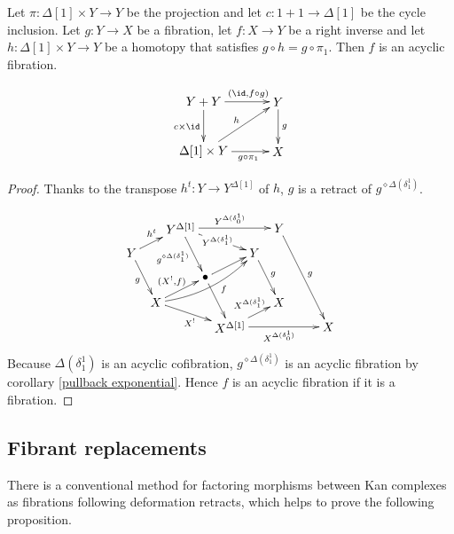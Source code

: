 \documentclass{tac}
\newcommand\hide[1]{}
\newcommand\bang{!}
\newcommand\of{:}
\newcommand\simplex\Delta
\newcommand\pe[1]{^{\diamond #1}}
\begin{document}
\begin{lemma} Let $\pi\of \simplex[1]\times Y\to Y$ be the projection and let $c\of 1+1\to\simplex[1]$ be the cycle inclusion. Let $g\of Y\to X$ be a fibration, let $f\of X\to Y$ be a right inverse and let $h\of \simplex[1]\times Y \to Y$ be a homotopy that satisfies $g\circ h = g\circ \pi_1$. Then $f$ is an acyclic fibration. \label{deformation is acyclic}
\hide{\[\xymatrix{
Y+Y\ar[rr]^{(\id,f\circ g)}\ar[d]_{c\times \id} && Y\ar[d]^g \\
\simplex[1]\times Y \ar[rr]_{g\circ\pi}\ar[urr]^h && X
}\]}
\[\xy
(0,14)*+{Y+Y}="up left",(21,14)*+{Y}="up right",
(0,0)*+{\simplex[1]\times Y}="down left",(21,0)*+{X}="down right"
\ar^(.6){(\id,f\circ g)} "up left";"up right" \ar_{c\times \id} "up left";"down left"
\ar^g "up right";"down right"
\ar_(.6){g\circ\pi_1} "down left";"down right" \ar^h "down left";"up right"
\endxy\]
\end{lemma}

\begin{proof}
Thanks to the transpose $h^t\of Y\to Y^{\simplex[1]}$ of $h$, $g$ is a retract of $g\pe{\simplex(\delta^1_1)}$.
\hide{\[\xymatrix{
Y\ar[d]_g \ar[r]^{h^t} & Y^{\simplex[1]} \ar[d]_{g\pe{\simplex(\delta^1_1)}} \ar[dr]^{Y^{\simplex(\delta^1_1)}} \ar[rr]^{Y^{\simplex(\delta^1_0)}}&& Y \ar[d]^g\\
X \ar[r]^{(X^\bang,f)} \ar[dr]_{X^\bang} \ar@/_3ex/[rr]_(.6)f & \bullet\ar[r]\ar[d] & Y \ar[d]_(.4)g & X \\
& X^{\simplex[1]} \ar[r]_{X^{\simplex(\delta_1^1)}} \ar@/_2ex/[urr]_(.7){X^{\simplex(\delta^1_0)}}& X
}\]}
\[\xy
(0,21)*+{Y}="Y0",(14,28)*+{Y^{\simplex[1]}}="Y1",(35,21)*+{Y}="Y2",(42,28)*+{Y}="Y3",
(21,14)*+{\bullet}="center",
(7,7)*+{X}="X0",(28,0)*+{X^{\simplex[1]}}="X1",(42,7)*+{X}="X2",(56,0)*+{X}="X3"
\ar_g "Y0";"X0" \ar^{h^t} "Y0";"Y1"
\ar_{g\pe{\simplex(\delta^1_1)}} "Y1";"center" \ar|{Y^{\simplex(\delta^1_1)}} "Y1";"Y2" \ar^{Y^{\simplex(\delta^1_0)}} "Y1";"Y3"
\ar^g "Y2";"X2"\ar^g "Y3";"X3"
\ar "center";"X1" \ar "center";"Y2"
\ar^{(X^\bang,f)} "X0";"center" \ar_{X^\bang} "X0";"X1" \ar@/_2ex/_(.6)f "X0";"Y2"
\ar^(.6){X^{\simplex(\delta_1^1)}} "X1";"X2" \ar_{X^{\simplex(\delta_0^1)}} "X1";"X3"
\endxy\]
Because $\simplex(\delta^1_1)$ is an acyclic cofibration, $g\pe{\simplex(\delta^1_1)}$ is an acyclic fibration by corollary \ref{pullback exponential}. Hence $f$ is an acyclic fibration if it is a fibration.
\end{proof}

\subsection{Fibrant replacements}
There is a conventional method for factoring morphisms between Kan complexes as fibrations following deformation retracts, which helps to prove the following proposition.
\end{document}
